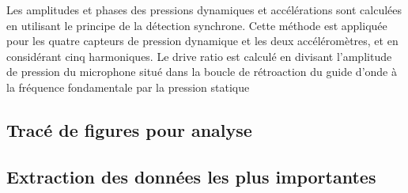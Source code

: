 Les amplitudes et phases des pressions dynamiques et accélérations sont calculées en utilisant le principe de la détection synchrone. Cette méthode est appliquée pour les quatre capteurs de pression dynamique et les deux accéléromètres, et en considérant cinq harmoniques. Le drive ratio est calculé en divisant l'amplitude de pression du microphone situé dans la boucle de rétroaction du guide d'onde à la fréquence fondamentale par la pression statique





\subsection{Tracé de figures pour analyse}

\subsection{Extraction des données les plus importantes}

